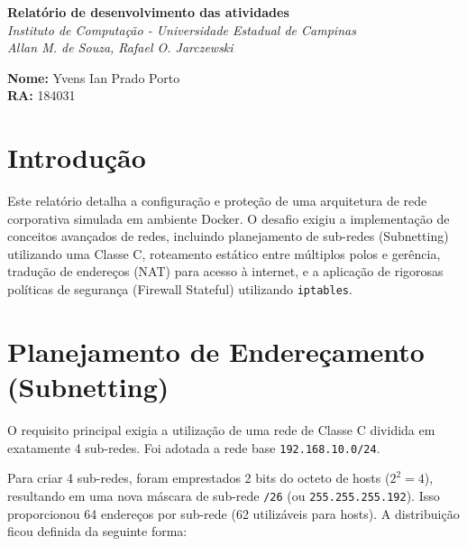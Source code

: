 \documentclass{article}
\begin{document}
\thispagestyle{empty} 
\noindent
{
\selectfont 
\fontsize{11pt}{13.2pt}\selectfont 
\begin{minipage}[c]{0.15\textwidth}
    \centering
    \LogoUnicamp 
\end{minipage}
\hfill
\begin{minipage}[c]{0.65\textwidth}
    \centering
    \textbf{Relatório de desenvolvimento das atividades}\\[0.2cm]
    \textit{Instituto de Computação - Universidade Estadual de Campinas\\Allan M. de Souza, Rafael O. Jarczewski}
\end{minipage}
\hfill
\begin{minipage}[c]{0.15\textwidth}
    \centering
    \LogoIcUnicamp 
\end{minipage}

\vspace{1cm}
}

\noindent\textbf{Nome:} Yvens Ian Prado Porto\\
\textbf{RA:} 184031

\section{Introdução}
Este relatório detalha a configuração e proteção de uma arquitetura de rede corporativa simulada em ambiente Docker. O desafio exigiu a implementação de conceitos avançados de redes, incluindo planejamento de sub-redes (Subnetting) utilizando uma Classe C, roteamento estático entre múltiplos polos e gerência, tradução de endereços (NAT) para acesso à internet, e a aplicação de rigorosas políticas de segurança (Firewall Stateful) utilizando \texttt{iptables}.

\section{Planejamento de Endereçamento (Subnetting)}
O requisito principal exigia a utilização de uma rede de Classe C dividida em exatamente 4 sub-redes. Foi adotada a rede base \texttt{192.168.10.0/24}. 

Para criar 4 sub-redes, foram emprestados 2 bits do octeto de hosts ($2^2 = 4$), resultando em uma nova máscara de sub-rede \texttt{/26} (ou \texttt{255.255.255.192}). Isso proporcionou 64 endereços por sub-rede (62 utilizáveis para hosts). A distribuição ficou definida da seguinte forma:
\end{document}
